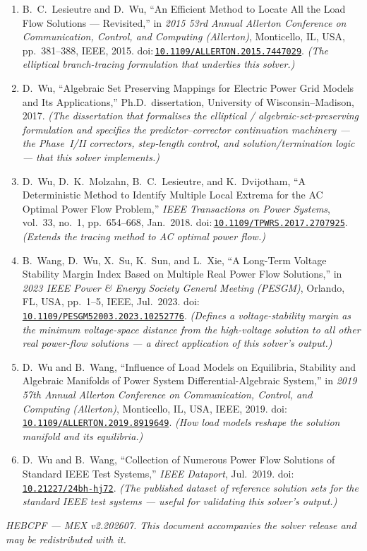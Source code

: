 \documentclass[11pt,a4paper]{article}
\newcommand{\doi}[1]{\href{https://doi.org/#1}{\nolinkurl{#1}}}
\begin{document}
\begin{enumerate}[leftmargin=1.6em]
\item B.\ C.\ Lesieutre and D.\ Wu, ``An Efficient Method to Locate All the Load Flow
      Solutions --- Revisited,'' in \emph{2015 53rd Annual Allerton Conference on
      Communication, Control, and Computing (Allerton)}, Monticello, IL, USA, pp.~381--388,
      IEEE, 2015. doi:\,\doi{10.1109/ALLERTON.2015.7447029}. \emph{(The elliptical
      branch-tracing formulation that underlies this solver.)}
\item D.\ Wu, ``Algebraic Set Preserving Mappings for Electric Power Grid Models and Its
      Applications,'' Ph.D.\ dissertation, University of Wisconsin--Madison, 2017.
      \emph{(The dissertation that formalises the elliptical / algebraic-set-preserving
      formulation and specifies the predictor--corrector continuation machinery --- the
      Phase~I/II correctors, step-length control, and solution/termination logic --- that
      this solver implements.)}
\item D.\ Wu, D.\ K.\ Molzahn, B.\ C.\ Lesieutre, and K.\ Dvijotham, ``A Deterministic
      Method to Identify Multiple Local Extrema for the AC Optimal Power Flow Problem,''
      \emph{IEEE Transactions on Power Systems}, vol.~33, no.~1, pp.~654--668, Jan.\ 2018.
      doi:\,\doi{10.1109/TPWRS.2017.2707925}.
      \emph{(Extends the tracing method to AC optimal power flow.)}
\item B.\ Wang, D.\ Wu, X.\ Su, K.\ Sun, and L.\ Xie, ``A Long-Term Voltage Stability
      Margin Index Based on Multiple Real Power Flow Solutions,'' in \emph{2023 IEEE Power
      \& Energy Society General Meeting (PESGM)}, Orlando, FL, USA, pp.~1--5, IEEE,
      Jul.\ 2023. doi:\,\doi{10.1109/PESGM52003.2023.10252776}.
      \emph{(Defines a voltage-stability margin as the
      minimum voltage-space distance from the high-voltage solution to all other real
      power-flow solutions --- a direct application of this solver's output.)}
\item D.\ Wu and B.\ Wang, ``Influence of Load Models on Equilibria, Stability and
      Algebraic Manifolds of Power System Differential-Algebraic System,'' in \emph{2019
      57th Annual Allerton Conference on Communication, Control, and Computing
      (Allerton)}, Monticello, IL, USA, IEEE, 2019.
      doi:\,\doi{10.1109/ALLERTON.2019.8919649}. \emph{(How load models reshape the
      solution manifold and its equilibria.)}
\item D.\ Wu and B.\ Wang, ``Collection of Numerous Power Flow Solutions of Standard IEEE
      Test Systems,'' \emph{IEEE Dataport}, Jul.\ 2019.
      doi:\,\doi{10.21227/24bh-hj72}. \emph{(The published dataset of reference solution
      sets for the standard IEEE test systems --- useful for validating this solver's
      output.)}
\end{enumerate}

\vfill
\begin{center}\small\itshape
HEBCPF --- MEX v2.202607. This document accompanies the solver release and may be
redistributed with it.
\end{center}
\end{document}
